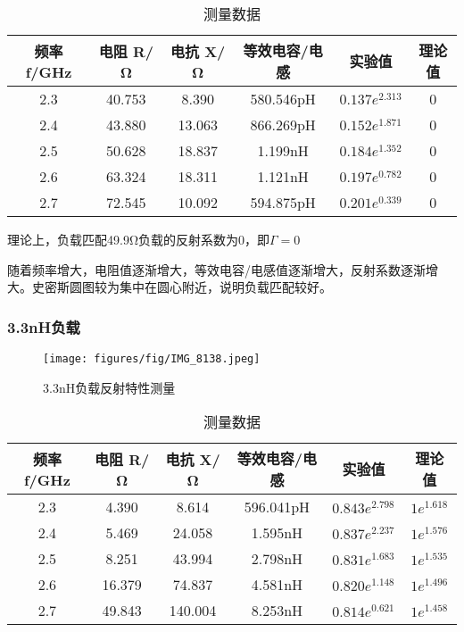 \documentclass[12pt,hyperref,a4paper,UTF8]{ctexart}
\begin{document}
    \begin{table}[h]
        \centering
        \begin{tabular}{cccccc}
        \hline
        频率 f/GHz & 电阻 R/Ω & 电抗 X/Ω & 等效电容/电感 & 实验值 & 理论值 \\
        \hline
        2.3 & 40.753 & 8.390 & 580.546pH & $0.137e^{2.313}$ & 0 \\
        2.4 & 43.880 & 13.063 & 866.269pH & $0.152e^{1.871}$ & 0 \\
        2.5 & 50.628 & 18.837 & 1.199nH & $0.184e^{1.352}$ & 0 \\
        2.6 & 63.324 & 18.311 & 1.121nH & $0.197e^{0.782}$ & 0 \\
        2.7 & 72.545 & 10.092 & 594.875pH & $0.201e^{0.339}$ & 0 \\
        \hline
        \end{tabular}
        \caption{测量数据}
        \label{tab:my_label}
        \end{table}

理论上，负载匹配49.9Ω负载的反射系数为0，即$\Gamma = 0$


随着频率增大，电阻值逐渐增大，等效电容/电感值逐渐增大，反射系数逐渐增大。史密斯圆图较为集中在圆心附近，说明负载匹配较好。

\subsubsection{3.3nH负载}
        \begin{figure}[H]
            \centering
            \texttt{[image: figures/fig/IMG\_8138.jpeg]}
            \caption{3.3nH负载反射特性测量}
            \label{fig:enter-label}
        \end{figure}
        
        \begin{table}[h]
            \centering
            \begin{tabular}{cccccc}
            \hline
            频率 f/GHz & 电阻 R/Ω & 电抗 X/Ω & 等效电容/电感 & 实验值 & 理论值 \\
            \hline
            2.3 & 4.390 & 8.614 & 596.041pH & $0.843e^{2.798}$ & $1e^{1.618}$ \\
            2.4 & 5.469 & 24.058 & 1.595nH & $0.837e^{2.237}$ & $1e^{1.576}$ \\
            2.5 & 8.251 & 43.994 & 2.798nH & $0.831e^{1.683}$ & $1e^{1.535}$ \\
            2.6 & 16.379 & 74.837 & 4.581nH & $0.820e^{1.148}$ & $1e^{1.496}$ \\
            2.7 & 49.843 & 140.004 & 8.253nH & $0.814e^{0.621}$ & $1e^{1.458}$ \\
            \hline
            \end{tabular}
            \caption{测量数据}
            \label{tab:my_label}
            \end{table}
\end{document}
